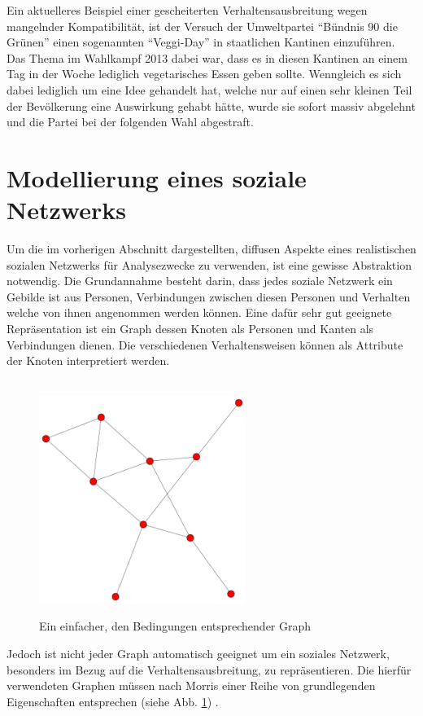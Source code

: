 \documentclass[12pt]{article}
\begin{document}
Ein aktuelleres Beispiel einer gescheiterten Verhaltensausbreitung wegen mangelnder Kompatibilität, ist der Versuch der Umweltpartei "`Bündnis 90 die Grünen"' einen sogenannten "`Veggi-Day"' in staatlichen Kantinen einzuführen. Das Thema im Wahlkampf 2013 dabei war, dass es in diesen Kantinen an einem Tag in der Woche lediglich vegetarisches Essen geben sollte. Wenngleich es sich dabei lediglich um eine Idee gehandelt hat, welche nur auf einen sehr kleinen Teil der Bevölkerung eine Auswirkung gehabt hätte, wurde sie sofort massiv abgelehnt und die Partei bei der folgenden Wahl abgestraft. 

\section{Modellierung eines soziale Netzwerks}
Um die im vorherigen Abschnitt dargestellten, diffusen Aspekte eines realistischen sozialen Netzwerks für Analysezwecke zu verwenden, ist eine gewisse Abstraktion notwendig. Die Grundannahme besteht darin, dass jedes soziale Netzwerk ein Gebilde ist aus Personen, Verbindungen zwischen diesen Personen und Verhalten welche von ihnen angenommen werden können. Eine dafür sehr gut geeignete Repräsentation ist ein Graph dessen Knoten als Personen und Kanten als Verbindungen dienen. Die verschiedenen Verhaltensweisen können als Attribute der Knoten interpretiert werden.\\\\
\begin{figure}
  \begin{center}
    \includegraphics[width=0.60\textwidth]{pic_simpleGraph.png}
    \label{pic_simpleGraph}
  \end{center}
  \caption{Ein einfacher, den Bedingungen entsprechender Graph}
\end{figure}Jedoch ist nicht jeder Graph automatisch geeignet um ein soziales Netzwerk, besonders im Bezug auf die Verhaltensausbreitung, zu repräsentieren. Die hierfür verwendeten Graphen müssen nach Morris \cite{morris98} einer Reihe von grundlegenden Eigenschaften entsprechen (siehe Abb. \ref{pic_simpleGraph}) .
\end{document}
